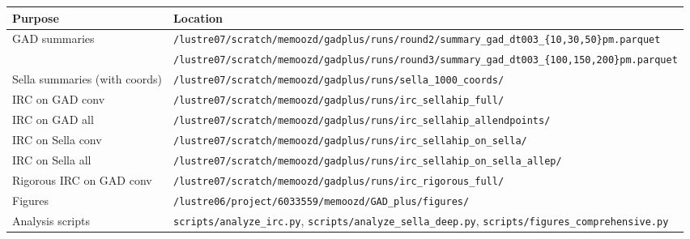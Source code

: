 \documentclass[11pt]{article}
\begin{document}
\begin{center}
\begin{tabular}{ll}
\toprule
Purpose & Location \\
\midrule
GAD summaries & \texttt{/lustre07/scratch/memoozd/gadplus/runs/round2/summary\_gad\_dt003\_\{10,30,50\}pm.parquet} \\
              & \texttt{/lustre07/scratch/memoozd/gadplus/runs/round3/summary\_gad\_dt003\_\{100,150,200\}pm.parquet} \\
Sella summaries (with coords) & \texttt{/lustre07/scratch/memoozd/gadplus/runs/sella\_1000\_coords/} \\
IRC on GAD conv & \texttt{/lustre07/scratch/memoozd/gadplus/runs/irc\_sellahip\_full/} \\
IRC on GAD all  & \texttt{/lustre07/scratch/memoozd/gadplus/runs/irc\_sellahip\_allendpoints/} \\
IRC on Sella conv & \texttt{/lustre07/scratch/memoozd/gadplus/runs/irc\_sellahip\_on\_sella/} \\
IRC on Sella all & \texttt{/lustre07/scratch/memoozd/gadplus/runs/irc\_sellahip\_on\_sella\_allep/} \\
Rigorous IRC on GAD conv & \texttt{/lustre07/scratch/memoozd/gadplus/runs/irc\_rigorous\_full/} \\
Figures & \texttt{/lustre06/project/6033559/memoozd/GAD\_plus/figures/} \\
Analysis scripts & \texttt{scripts/analyze\_irc.py}, \texttt{scripts/analyze\_sella\_deep.py}, \texttt{scripts/figures\_comprehensive.py} \\
\bottomrule
\end{tabular}
\end{center}
\end{document}
